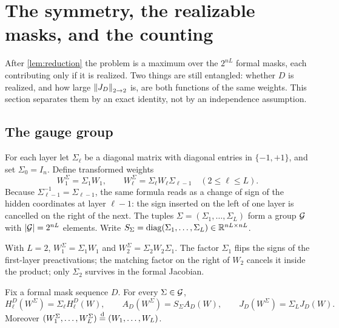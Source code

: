 \section{The symmetry, the realizable masks, and the counting}
\label{sec:gauge}

After \cref{lem:reduction} the problem is a maximum over the $2^{nL}$ formal masks, each contributing only if it is realized. Two things are still entangled: whether $D$ is realized, and how large $\left\lVert J_D\right\rVert_{2\to 2}$ is, are both functions of the same weights. This section separates them by an exact identity, not by an independence assumption.

\subsection{The gauge group}

For each layer let $\Sigma_\ell$ be a diagonal matrix with diagonal entries in $\{-1,+1\}$, and set $\Sigma_0=I_n$. Define transformed weights
\begin{equation}\label{eq:gauge}
W^\Sigma_1=\Sigma_1W_1,\qquad W^\Sigma_\ell=\Sigma_\ell W_\ell\Sigma_{\ell-1}\quad(2\le\ell\le L).
\end{equation}
Because $\Sigma_{\ell-1}^{-1}=\Sigma_{\ell-1}$, the same formula reads as a change of sign of the hidden coordinates at layer $\ell-1$: the sign inserted on the left of one layer is cancelled on the right of the next. The tuples $\Sigma=(\Sigma_1,\dots,\Sigma_L)$ form a group $\mathcal{G}$ with $\left\lvert \mathcal{G}\right\rvert=2^{nL}$ elements. Write $S_\Sigma=\operatorname{diag}(\Sigma_1,\dots,\Sigma_L)\in\mathbb{R}^{nL\times nL}$.

\begin{example}
With $L=2$, $W^\Sigma_1=\Sigma_1W_1$ and $W^\Sigma_2=\Sigma_2W_2\Sigma_1$. The factor $\Sigma_1$ flips the signs of the first-layer preactivations; the matching factor on the right of $W_2$ cancels it inside the product; only $\Sigma_2$ survives in the formal Jacobian.
\end{example}

\begin{lemma}\label{lem:covariance}
Fix a formal mask sequence $D$. For every $\Sigma\in\mathcal{G}$,
\begin{equation}\label{eq:cov}
H^D_\ell(W^\Sigma)=\Sigma_\ell H^D_\ell(W),\qquad A_D(W^\Sigma)=S_\Sigma A_D(W),\qquad J_D(W^\Sigma)=\Sigma_LJ_D(W).
\end{equation}
Moreover $(W^\Sigma_1,\dots,W^\Sigma_L)\overset{\mathrm{d}}{=}(W_1,\dots,W_L)$.
\end{lemma}

